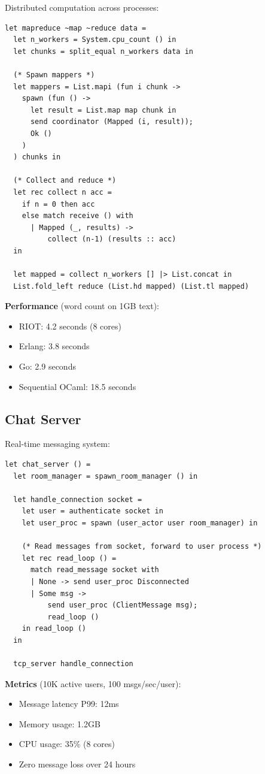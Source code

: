 \documentclass[12pt,a4paper]{report}
\begin{document}
Distributed computation across processes:

\begin{lstlisting}
let mapreduce ~map ~reduce data =
  let n_workers = System.cpu_count () in
  let chunks = split_equal n_workers data in
  
  (* Spawn mappers *)
  let mappers = List.mapi (fun i chunk ->
    spawn (fun () ->
      let result = List.map map chunk in
      send coordinator (Mapped (i, result));
      Ok ()
    )
  ) chunks in
  
  (* Collect and reduce *)
  let rec collect n acc =
    if n = 0 then acc
    else match receive () with
      | Mapped (_, results) ->
          collect (n-1) (results :: acc)
  in
  
  let mapped = collect n_workers [] |> List.concat in
  List.fold_left reduce (List.hd mapped) (List.tl mapped)
\end{lstlisting}

\textbf{Performance} (word count on 1GB text):
\begin{itemize}
\item RIOT: 4.2 seconds (8 cores)
\item Erlang: 3.8 seconds  
\item Go: 2.9 seconds
\item Sequential OCaml: 18.5 seconds
\end{itemize}

\subsection{Chat Server}

Real-time messaging system:

\begin{lstlisting}
let chat_server () =
  let room_manager = spawn_room_manager () in
  
  let handle_connection socket =
    let user = authenticate socket in
    let user_proc = spawn (user_actor user room_manager) in
    
    (* Read messages from socket, forward to user process *)
    let rec read_loop () =
      match read_message socket with
      | None -> send user_proc Disconnected
      | Some msg ->
          send user_proc (ClientMessage msg);
          read_loop ()
    in read_loop ()
  in
  
  tcp_server handle_connection
\end{lstlisting}

\textbf{Metrics} (10K active users, 100 msgs/sec/user):
\begin{itemize}
\item Message latency P99: 12ms
\item Memory usage: 1.2GB
\item CPU usage: 35\% (8 cores)
\item Zero message loss over 24 hours
\end{itemize}
\end{document}
